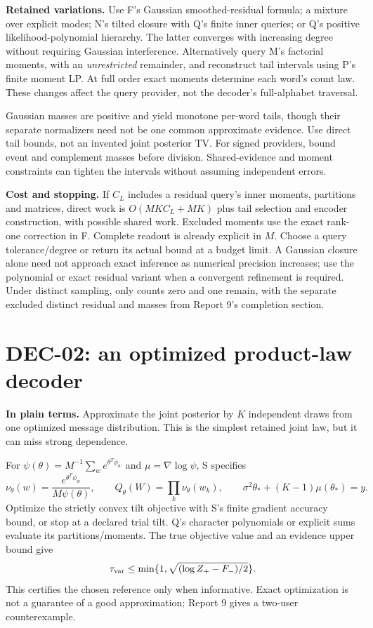 \documentclass[10pt,a4paper]{article}
\begin{document}
\textbf{Retained variations.}
Use F's Gaussian smoothed-residual formula; a mixture over explicit modes; N's tilted closure with
Q's finite inner queries; or Q's positive likelihood-polynomial hierarchy.
The latter converges with increasing degree without requiring Gaussian interference.
Alternatively query M's factorial moments, with an \emph{unrestricted} remainder, and reconstruct
tail intervals using P's finite moment LP. At full order exact moments determine each word's count law.
These changes affect the query provider, not the decoder's full-alphabet traversal.

Gaussian masses are positive and yield monotone per-word tails, though their separate normalizers need
not be one common approximate evidence. Use direct tail bounds, not an invented joint posterior TV.
For signed providers, bound event and complement masses before division. Shared-evidence and moment
constraints can tighten the intervals without assuming independent errors.

\textbf{Cost and stopping.} If $C_L$ includes a residual query's inner moments, partitions and matrices,
direct work is $O(MKC_L+MK)$ plus tail selection and encoder construction, with possible shared work.
Excluded moments use the exact rank-one correction in F. Complete readout is already explicit in $M$.
Choose a query tolerance/degree or return its actual bound at a budget limit. A Gaussian closure alone
need not approach exact inference as numerical precision increases; use the polynomial or exact residual
variant when a convergent refinement is required.
Under distinct sampling, only counts zero and one remain, with the separate excluded distinct residual
and masses from Report 9's completion section.

\clearpage
\section{DEC-02: an optimized product-law decoder}
\label{sec:product}
\textbf{In plain terms.} Approximate the joint posterior by $K$ independent draws from one optimized
message distribution. This is the simplest retained joint law, but it can miss strong dependence.

For $\psi(\theta)=M^{-1}\sum_w e^{\theta^T\phi_w}$ and $\mu=\nabla\log\psi$, S specifies
\[
 \nu_\theta(w)=\frac{e^{\theta^T\phi_w}}{M\psi(\theta)},\qquad
 Q_\theta(W)=\prod_k\nu_\theta(w_k),\qquad
 \sigma^2\theta_*+(K-1)\mu(\theta_*)=y.
\]
Optimize the strictly convex tilt objective with S's finite gradient accuracy bound, or stop at a
declared trial tilt. Q's character polynomials or explicit sums evaluate its partitions/moments.
The true objective value and an evidence upper bound give
\[
 \tau_{\rm var}\leq
 \min\{1,\sqrt{(\log Z_+-F_-)/2}\}.
\]
This certifies the chosen reference only when informative. Exact optimization is not a guarantee of a
good approximation; Report 9 gives a two-user counterexample.
\end{document}
